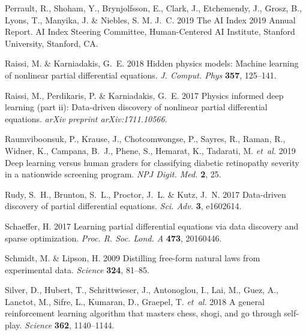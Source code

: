 \documentclass{article}
\begin{document}
\begin{thebibliography}{30}
{\sc Perrault, R., Shoham, Y., Brynjolfsson, E., Clark, J., Etchemendy, J.,
  Grosz, B., Lyons, T., Manyika, J. \& Niebles, S. M. J.~C.} 2019 {The AI Index
  2019 Annual Report}. AI Index Steering Committee, Human-Centered AI
  Institute, Stanford University, Stanford, CA.

{\sc Raissi, M. \& Karniadakis, G.~E.} 2018 Hidden physics models: Machine
  learning of nonlinear partial differential equations. {\em J. Comput. Phys\/} {\bf 357}, 125--141.

{\sc Raissi, M., Perdikaris, P. \& Karniadakis, G.~E.} 2017 Physics informed
  deep learning (part ii): Data-driven discovery of nonlinear partial
  differential equations. {\em arXiv preprint arXiv:1711.10566\/}.

{\sc Raumviboonsuk, P., Krause, J., Chotcomwongse, P., Sayres, R., Raman, R.,
  Widner, K., Campana, B.~J., Phene, S., Hemarat, K., Tadarati, M. {\em
  et~al.\/}} 2019 Deep learning versus human graders for classifying diabetic
  retinopathy severity in a nationwide screening program. {\em NPJ Digit. Med.\/} {\bf 2}, 25.

{\sc Rudy, S.~H., Brunton, S.~L., Proctor, J.~L. \& Kutz, J.~N.} 2017
  Data-driven discovery of partial differential equations. {\em Sci. Adv.\/} {\bf 3}, e1602614.

{\sc Schaeffer, H.} 2017 Learning partial differential equations via data
  discovery and sparse optimization. {\em Proc. R. Soc. Lond. A\/} {\bf 473},
  20160446.

{\sc Schmidt, M. \& Lipson, H.} 2009 Distilling free-form natural laws from
  experimental data. {\em Science\/} {\bf 324}, 81--85.

{\sc Silver, D., Hubert, T., Schrittwieser, J., Antonoglou, I., Lai, M., Guez,
  A., Lanctot, M., Sifre, L., Kumaran, D., Graepel, T. {\em et~al.\/}} 2018 A
  general reinforcement learning algorithm that masters chess, shogi, and go
  through self-play. {\em Science\/} {\bf 362}, 1140--1144.


\end{thebibliography}
\end{document}

